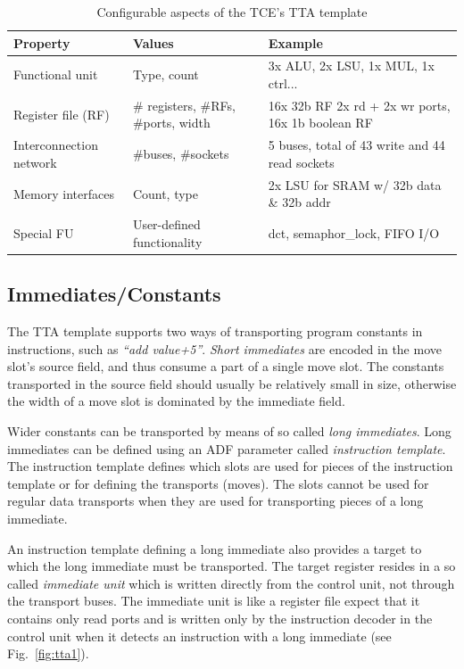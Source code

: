 \documentclass[twoside]{tceusermanual}
\begin{document}
\begin{table}
  \begin{center}
    \caption {Configurable aspects of the TCE's TTA template}
    \label {tab:filetypes}
    \begin{tabular}{l | l | l }
      \hline
      Property & Values & Example  \\
      \hline
      \hline
      Functional unit         & Type, count                         & 3x ALU, 2x LSU, 1x MUL, 1x ctrl...\\
      Register file (RF)      & \# registers, \#RFs, \#ports, width & 16x 32b RF 2x rd + 2x wr ports, 16x 1b boolean RF \\
      Interconnection network & \#buses, \#sockets                & 5 buses, total of 43 write and 44 read sockets\\
      Memory interfaces       & Count, type                       & 2x LSU for SRAM w/ 32b data \& 32b addr \\
      Special FU              & User-defined functionality        & dct, semaphor\_lock, FIFO I/O \\
      \hline
    \end{tabular}
  \end{center}
\end{table}

\subsection{Immediates/Constants}

The TTA template supports two ways of transporting program constants
in instructions, such as \textit{``add value+5''}. \textit{Short
  immediates} are encoded in the move slot's source field, and thus
consume a part of a single move slot. The constants transported in the
source field should usually be relatively small in size, otherwise the
width of a move slot is dominated by the immediate field.

Wider constants can be transported by means of so called \textit{long
  immediates}. Long immediates can be defined using an ADF parameter
called \textit{instruction template}. The instruction template defines
which slots are used for pieces of the instruction template or for
defining the transports (moves).  The slots cannot be used for regular
data transports when they are used for transporting pieces of a long
immediate.

An instruction template defining a long immediate also provides
a target to which the long immediate must be transported. The target register
resides in a so called \textit{immediate unit} which is written directly 
from the control unit, not through the transport buses. The immediate unit is like
a register file expect that it contains only read ports and is written
only by the instruction decoder in the control unit when it detects an 
instruction with a long immediate (see Fig.~\ref{fig:tta1}).
\end{document}
